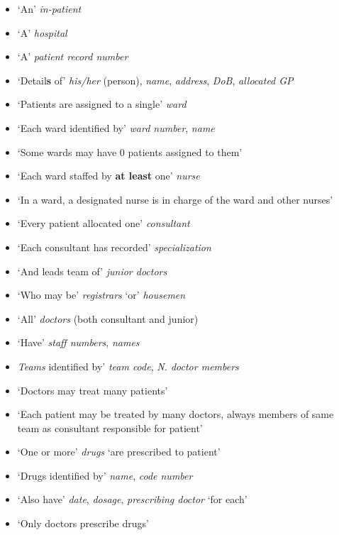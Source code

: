 \documentclass[11pt, english]{article}
\begin{document}
	\begin{itemize}
        \setlength\itemsep{0cm}
		\item `An' \textit{in-patient}
		\item `A' \textit{hospital}
		\item `A' \textit{patient record number}
		\item `Detail\textbf{s} of' \textit{his/her} (person), \textit{name}, \textit{address}, \textit{DoB}, \textit{allocated GP}
		\item `Patients are assigned to a single' \textit{ward}
		\item `Each ward identified by' \textit{ward number}, \textit{name}
		\item `Some wards may have 0 patients assigned to them'
		\item `Each ward staffed by \textbf{at least} one' \textit{nurse}
		\item `In a ward, a designated nurse is in charge of the ward and other nurses'
	\end{itemize}

	\begin{itemize}
        \setlength\itemsep{0cm}
		\item `Every patient allocated one' \textit{consultant}
		\item `Each consultant has recorded' \textit{specialization}
		\item `And leads team of' \textit{junior doctors}
		\item `Who may be' \textit{registrars} `or' \textit{housemen}
		\item `All' \textit{doctors} (both consultant and junior)
		\item `Have' \textit{staff numbers}, \textit{names}
		\item \textit{Teams} identified by' \textit{team code}, \textit{N. doctor members}
	\end{itemize}

	\begin{itemize}
        \setlength\itemsep{0cm}
		\item `Doctors may treat many patients'
		\item `Each patient may be treated by many doctors, always members of same team as consultant responsible for patient'
		\item `One or more' \textit{drugs} `are prescribed to patient'
		\item `Drugs identified by' \textit{name}, \textit{code number}
		\item `Also have' \textit{date}, \textit{dosage}, \textit{prescribing doctor} `for each'
		\item `Only doctors prescribe drugs'
	\end{itemize}
\end{document}
